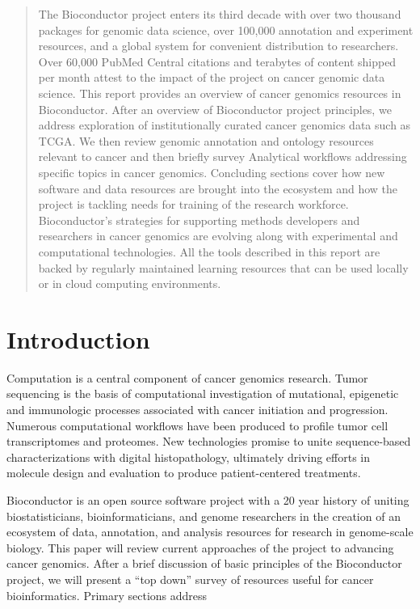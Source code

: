 \maketitle
\begin{abstract}
The Bioconductor project enters its third decade with over two thousand packages for genomic data science, over 100,000 annotation and experiment resources, and a global system for convenient distribution to researchers. Over 60,000 PubMed Central citations and terabytes of content shipped per month attest to the impact of the project on cancer genomic data science. This report provides an overview of cancer genomics resources in Bioconductor. After an overview of Bioconductor project principles, we address exploration of institutionally curated cancer genomics data such as TCGA. We then review genomic annotation and ontology resources relevant to cancer and then briefly survey Analytical workflows addressing specific topics in cancer genomics. Concluding sections cover how new software and data resources are brought into the ecosystem and how the project is tackling needs for training of the research workforce. Bioconductor's strategies for supporting methods developers and researchers in cancer genomics are evolving along with experimental and computational technologies. All the tools described in this report are backed by regularly maintained learning resources that can be used locally or in cloud computing environments.
\end{abstract}


\hypertarget{introduction}{%
\section{Introduction}\label{introduction}}

Computation is a central component of cancer genomics
research. Tumor sequencing is the basis of computational
investigation of mutational, epigenetic and immunologic
processes associated with cancer initiation and progression.
Numerous computational workflows have been produced to
profile tumor cell transcriptomes and proteomes.
New technologies promise to unite sequence-based
characterizations with digital histopathology,
ultimately driving efforts in molecule design
and evaluation to produce patient-centered treatments.

Bioconductor is an open source software project with
a 20 year history of uniting biostatisticians, bioinformaticians,
and genome researchers in the creation of an ecosystem
of data, annotation, and analysis resources for research
in genome-scale biology. This paper will review current
approaches of the project to advancing cancer genomics.
After a brief discussion of basic principles of the Bioconductor
project, we will present a ``top down'' survey of resources
useful for cancer bioinformatics. Primary sections address

